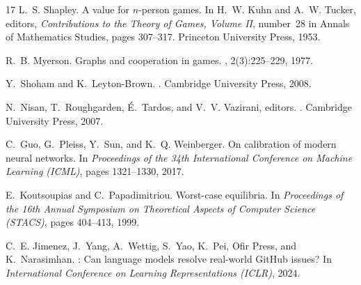 \documentclass{article}
\theoremstyle{definition}
\begin{document}
\begin{thebibliography}{17}
L.~S. Shapley.
\newblock A value for $n$-person games.
\newblock In H.~W. Kuhn and A.~W. Tucker, editors, {\em Contributions to the Theory of Games, Volume II}, number~28 in Annals of Mathematics Studies, pages 307--317. Princeton University Press, 1953.

R.~B. Myerson.
\newblock Graphs and cooperation in games.
, 2(3):225--229, 1977.

Y.~Shoham and K.~Leyton-Brown.
.
\newblock Cambridge University Press, 2008.

N.~Nisan, T.~Roughgarden, {\'E}.~Tardos, and V.~V. Vazirani, editors.
.
\newblock Cambridge University Press, 2007.

C.~Guo, G.~Pleiss, Y.~Sun, and K.~Q. Weinberger.
\newblock On calibration of modern neural networks.
\newblock In {\em Proceedings of the 34th International Conference on Machine Learning (ICML)}, pages 1321--1330, 2017.

E.~Koutsoupias and C.~Papadimitriou.
\newblock Worst-case equilibria.
\newblock In {\em Proceedings of the 16th Annual Symposium on Theoretical Aspects of Computer Science (STACS)}, pages 404--413, 1999.

C.~E. Jimenez, J.~Yang, A.~Wettig, S.~Yao, K.~Pei, Ofir Press, and K.~Narasimhan.
: Can language models resolve real-world {GitHub} issues?
\newblock In {\em International Conference on Learning Representations (ICLR)}, 2024.

\end{thebibliography}
\end{document}
